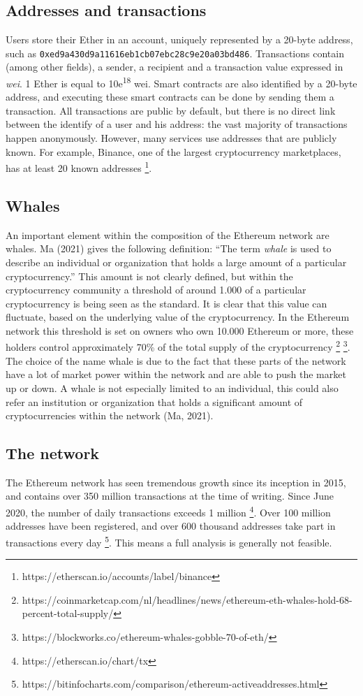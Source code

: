 \documentclass[10pt,a4paper]{article}
\begin{document}
\begin{multicols}{2}
\subsection{Addresses and transactions}
Users store their Ether in an account, uniquely represented by a 20-byte address, such as \texttt{0xed9a430d9a11616eb1cb07ebc28c9e20a03bd486}. Transactions contain (among other fields), a sender, a recipient and a transaction value expressed in \textit{wei}. 1 Ether is equal to 10e\textsuperscript{18} wei. Smart contracts are also identified by a 20-byte address, and executing these smart contracts can be done by sending them a transaction. All transactions are public by default, but there is no direct link between the identify of a user and his address: the vast majority of transactions happen anonymously. However, many services use addresses that are publicly known. For example, Binance, one of the largest cryptocurrency marketplaces, has at least 20 known addresses \footnote{https://etherscan.io/accounts/label/binance}.
\subsection{Whales}
An important element within the composition of the Ethereum network are whales. Ma (2021) gives the following definition: “The term \textit {whale} is used to describe an individual or organization that holds a large amount of a particular cryptocurrency.” This amount is not clearly defined, but within the cryptocurrency community a threshold of around 1.000 of a particular cryptocurrency is being seen as the standard. It is clear that this value can fluctuate, based on the underlying value of the cryptocurrency. In the Ethereum network this threshold is set on owners who own 10.000 Ethereum or more, these holders control approximately 70\% of the total supply of the cryptocurrency \footnote {https://coinmarketcap.com/nl/headlines/news/ethereum-eth-whales-hold-68-percent-total-supply/} \footnote {https://blockworks.co/ethereum-whales-gobble-70-of-eth/}. The choice of the name whale is due to the fact that these parts of the network have a lot of market power within the network and are able to push the market up or down. A whale is not especially limited to an individual, this could also refer an institution or organization that holds a significant amount of cryptocurrencies within the network (Ma, 2021).


\subsection{The network}
The Ethereum network has seen tremendous growth since its inception in 2015, and contains over 350 million transactions at the time of writing. Since June 2020, the number of daily transactions exceeds 1 million \footnote{https://etherscan.io/chart/tx}. Over 100 million addresses have been registered, and over 600 thousand addresses take part in transactions every day \footnote{https://bitinfocharts.com/comparison/ethereum-activeaddresses.html}. This means a full analysis is generally not feasible.


\end{multicols}
\end{document}
